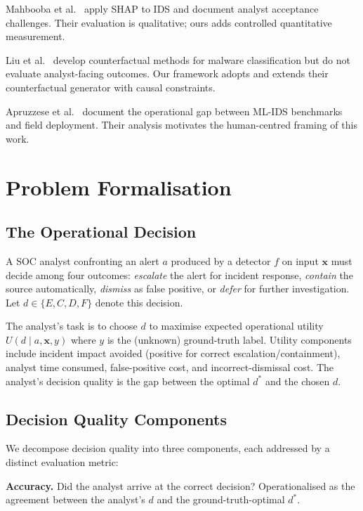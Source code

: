 \documentclass[sigconf,nonacm]{acmart}
\begin{document}
Mahbooba et al.~\cite{mahbooba2023} apply SHAP to IDS and document analyst
acceptance challenges. Their evaluation is qualitative; ours adds
controlled quantitative measurement.

Liu et al.~\cite{liu2024xai} develop counterfactual methods for malware
classification but do not evaluate analyst-facing outcomes. Our framework
adopts and extends their counterfactual generator with causal constraints.

Apruzzese et al.~\cite{apruzzese2023sok} document the operational gap
between ML-IDS benchmarks and field deployment. Their analysis motivates the
human-centred framing of this work.

\section{Problem Formalisation}
\label{sec:problem}

\subsection{The Operational Decision}

A SOC analyst confronting an alert $a$ produced by a detector $f$ on input
$\mathbf{x}$ must decide among four outcomes: \emph{escalate} the alert for
incident response, \emph{contain} the source automatically, \emph{dismiss}
as false positive, or \emph{defer} for further investigation. Let
$d \in \{E, C, D, F\}$ denote this decision.

The analyst's task is to choose $d$ to maximise expected operational utility
$U(d \mid a, \mathbf{x}, y)$ where $y$ is the (unknown) ground-truth label.
Utility components include incident impact avoided (positive for correct
escalation/containment), analyst time consumed, false-positive cost, and
incorrect-dismissal cost. The analyst's decision quality is the gap between
the optimal $d^*$ and the chosen $d$.

\subsection{Decision Quality Components}

We decompose decision quality into three components, each addressed by a
distinct evaluation metric:

\textbf{Accuracy.} Did the analyst arrive at the correct decision?
Operationalised as the agreement between the analyst's $d$ and the
ground-truth-optimal $d^*$.
\end{document}
